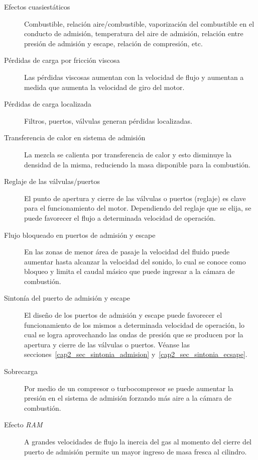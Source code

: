 \begin{description}
    \item [Efectos cuasiestáticos] Combustible, relación aire/combustible,
vaporización del combustible en el conducto de admisión, temperatura del aire de
admisión, relación entre presión de admisión y escape, relación de compresión,
etc.
  \item [Pérdidas de carga por fricción viscosa] Las pérdidas viscosas aumentan
con la velocidad de flujo y aumentan a medida que aumenta la velocidad de giro
del motor.
  \item [Pérdidas de carga localizada] Filtros, puertos, válvulas generan
pérdidas localizadas.
  \item [Transferencia de calor en sistema de admisión] La mezcla se calienta
por transferencia de calor y esto disminuye la densidad de la misma, reduciendo
la masa disponible para la combustión.
  \item [Reglaje de las válvulas/puertos] El punto de apertura y cierre de las
válvulas o  puertos (reglaje) es clave para el funcionamiento del motor.
Dependiendo del reglaje que se elija, se puede favorecer el flujo a determinada
velocidad de operación.
    \item [Flujo bloqueado en puertos de admisión y escape] En las zonas de
menor área de pasaje la velocidad del fluido puede aumentar hasta alcanzar la
velocidad del sonido, lo cual se conoce como bloqueo y limita el caudal másico que
puede ingresar a la cámara de combustión.
    \item [Sintonía del puerto de admisión y escape] El diseño de los puertos de
admisión y escape puede favorecer el funcionamiento de los mismos a determinada
velocidad de operación, lo cual se logra aprovechando las ondas de presión que
se producen por la apertura y cierre de las válvulas o puertos.
Véanse las secciones~\ref{cap2_sec_sintonia_admision} y~\ref{cap2_sec_sintonia_ecsape}.
  \item [Sobrecarga] Por medio de un compresor o turbocompresor se puede
aumentar la presión en el sistema de admisión forzando más aire a la cámara de
combustión.
    \item [Efecto \textit{RAM}] A grandes velocidades de flujo la inercia del
gas al momento del cierre del puerto de admisión permite un mayor ingreso de
masa fresca al cilindro.
\end{description}

